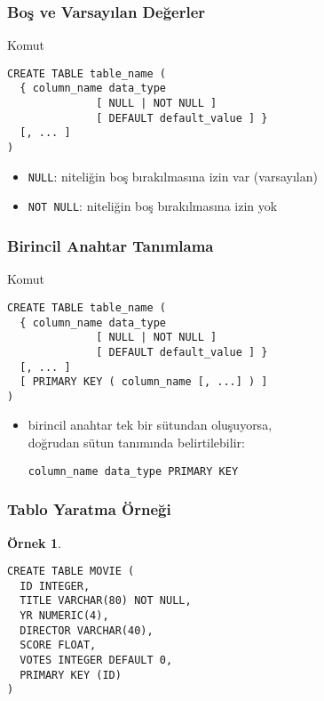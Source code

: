\documentclass[dvipsnames]{beamer}
\theoremstyle{definition}
\theoremstyle{example}
\newtheorem{ornek}[theorem]{Örnek}
\theoremstyle{plain}
\begin{document}
\begin{frame}[fragile]
  \frametitle{Boş ve Varsayılan Değerler}

  \begin{block}{Komut}
    \begin{lstlisting}
CREATE TABLE table_name (
  { column_name data_type
              [ NULL | NOT NULL ]
              [ DEFAULT default_value ] }
  [, ... ]
)
    \end{lstlisting}
  \end{block}

  \pause
  \begin{itemize}
    \item \texttt{NULL}: niteliğin boş bırakılmasına izin var (varsayılan)
    \item \texttt{NOT NULL}: niteliğin boş bırakılmasına izin yok
  \end{itemize}
\end{frame}

\begin{frame}[fragile]
  \frametitle{Birincil Anahtar Tanımlama}

  \begin{block}{Komut}
    \begin{lstlisting}
CREATE TABLE table_name (
  { column_name data_type
              [ NULL | NOT NULL ]
              [ DEFAULT default_value ] }
  [, ... ]
  [ PRIMARY KEY ( column_name [, ...] ) ]
)
    \end{lstlisting}
  \end{block}

  \pause
  \begin{itemize}
    \item birincil anahtar tek bir sütundan oluşuyorsa,\\
      doğrudan sütun tanımında belirtilebilir:
      \begin{lstlisting}
column_name data_type PRIMARY KEY
      \end{lstlisting}
  \end{itemize}
\end{frame}

\begin{frame}[fragile]
  \frametitle{Tablo Yaratma Örneği}

  \begin{ornek}
    \begin{lstlisting}
CREATE TABLE MOVIE (
  ID INTEGER,
  TITLE VARCHAR(80) NOT NULL,
  YR NUMERIC(4),
  DIRECTOR VARCHAR(40),
  SCORE FLOAT,
  VOTES INTEGER DEFAULT 0,
  PRIMARY KEY (ID)
)
    \end{lstlisting}
  \end{ornek}
\end{frame}
\end{document}
